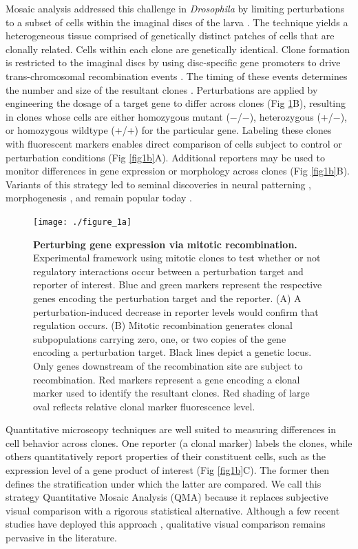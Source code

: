 \documentclass[10pt,letterpaper]{article}
\begin{document}
Mosaic analysis addressed this challenge in \textit{Drosophila} by limiting perturbations to a subset of cells within the imaginal discs of the larva \cite{Xu1993,Xu2012}. The technique yields a heterogeneous tissue comprised of genetically distinct patches of cells that are clonally related. Cells within each clone are genetically identical. Clone formation is restricted to the imaginal discs by using disc-specific gene promoters to drive trans-chromosomal recombination events \cite{Newsome2000,Theodosiou1998}. The timing of these events determines the number and size of the resultant clones \cite{Struhl1993}. Perturbations are applied by engineering the dosage of a target gene to differ across clones (Fig \ref{fig1a}B), resulting in clones whose cells are either homozygous mutant ($-$/$-$), heterozygous (+/$-$), or homozygous wildtype (+/+) for the particular gene. Labeling these clones with fluorescent markers enables direct comparison of cells subject to control or perturbation conditions (Fig \ref{fig1b}A). Additional reporters may be used to monitor differences in gene expression or morphology across clones (Fig \ref{fig1b}B). Variants of this strategy led to seminal discoveries in neural patterning \cite{Halfar2001,Tomlinson2001,Yang2001}, morphogenesis \cite{Huang2005,Thompson2006}, and remain popular today \cite{Atkins2019,Enomoto2018,Germani2018}.

\begin{figure}[!h]
\centering
\texttt{[image: ./figure\_1a]}
\caption[Perturbing gene expression via mitotic recombination.]{\textbf{Perturbing gene expression via mitotic recombination.} Experimental framework using mitotic clones to test whether or not regulatory interactions occur between a perturbation target and reporter of interest. Blue and green markers represent the respective genes encoding the perturbation target and the reporter. (A) A perturbation-induced decrease in reporter levels would confirm that regulation occurs. (B) Mitotic recombination generates clonal subpopulations carrying zero, one, or two copies of the gene encoding a perturbation target. Black lines depict a genetic locus. Only genes downstream of the recombination site are subject to recombination. Red markers represent a gene encoding a clonal marker used to identify the resultant clones. Red shading of large oval reflects relative clonal marker fluorescence level.}
\label{fig1a}
\end{figure}

Quantitative microscopy techniques are well suited to measuring differences in cell behavior across clones. One reporter (a clonal marker) labels the clones, while others quantitatively report properties of their constituent cells, such as the expression level of a gene product of interest (Fig \ref{fig1b}C). The former then defines the stratification under which the latter are compared. We call this strategy Quantitative Mosaic Analysis (QMA) because it replaces subjective visual comparison with a rigorous statistical alternative. Although a few recent studies have deployed this approach \cite{Dai2017,Bernasek2018,Ghiglione2018,Li2018}, qualitative visual comparison remains pervasive in the literature.
\end{document}
